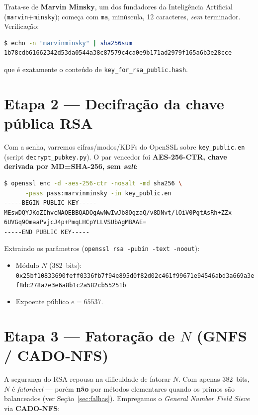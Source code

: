 \documentclass[11pt,a4paper]{article}
\begin{document}
\begin{center}\end{center}

\noindent Trata-se de \textbf{Marvin Minsky}, um dos fundadores da Inteligência Artificial
(\texttt{marvin}+\texttt{minsky}); começa com \texttt{ma}, minúscula, 12 caracteres, \emph{sem}
terminador. Verificação:
\begin{lstlisting}[style=plain,language=bash]
$ echo -n "marvinminsky" | sha256sum
1b78cdb61662342d53da0544a38c87579c4ca0e9b171ad2979f165a6b3e28cce
\end{lstlisting}
que é exatamente o conteúdo de \texttt{key\_for\_rsa\_public.hash}.

\section{Etapa 2 --- Decifração da chave pública RSA}
Com a senha, varremos cifras/modos/KDFs do OpenSSL sobre \texttt{key\_public.en}
(script \texttt{decrypt\_pubkey.py}). O par vencedor foi \textbf{AES-256-CTR, chave derivada por
MD=SHA-256, sem \emph{salt}}:
\begin{lstlisting}[style=plain,language=bash]
$ openssl enc -d -aes-256-ctr -nosalt -md sha256 \
      -pass pass:marvinminsky -in key_public.en
-----BEGIN PUBLIC KEY-----
MEswDQYJKoZIhvcNAQEBBQADOgAwNwIwJb8QgzaQ/v8DNvt/lOiV0PgtAsRh+ZZx
6UVGq9OmaaPvjcJ4p+PmqLHCpYLLVSUbAgMBAAE=
-----END PUBLIC KEY-----
\end{lstlisting}
Extraindo os parâmetros (\texttt{openssl rsa -pubin -text -noout}):
\begin{itemize}[nosep]
  \item Módulo $N$ (382~bits):\\
  \texttt{\footnotesize 0x25bf10833690feff0336fb7f94e895d0f82d02c461f99671e94546abd3a669a3ef8dc278a7e3e6a8b1c2a582cb55251b}
  \item Expoente público $e = 65537$.
\end{itemize}

\section{Etapa 3 --- Fatoração de $N$ (GNFS / CADO-NFS)}
A segurança do RSA repousa na dificuldade de fatorar $N$. Com apenas 382~bits, $N$ é
\emph{fatorável} --- porém \textbf{não} por métodos elementares quando os primos são balanceados
(ver Seção~\ref{sec:falhas}). Empregamos o \emph{General Number Field Sieve} via \textbf{CADO-NFS}:
\end{document}
